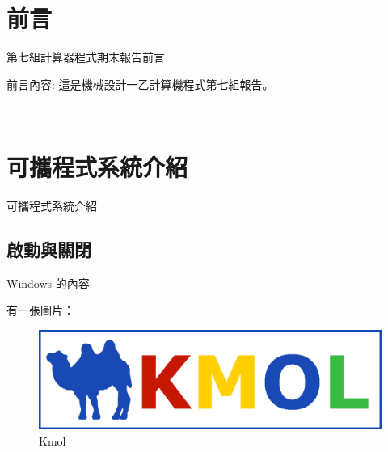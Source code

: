 \documentclass[12pt,,]{report}
\begin{document}
\begingroup
    \renewcommand{\contentsname}{\center 目錄 \addcontentsline{toc}{chapter}{目錄}}
    \renewcommand{\numberline}[1]{~#1\hspace*{1em}}
        \setcounter{tocdepth}{2}
    \tableofcontents
    \newcommand{\lotlabel}{表}
    \renewcommand{\listtablename}{\center 表目錄 \addcontentsline{toc}{chapter}{表目錄}}
    \renewcommand{\numberline}[1]{\lotlabel~#1\hspace*{1em}}
    \listoftables
    \newcommand{\loflabel}{圖}
    \renewcommand{\listfigurename}{\center 圖目錄 \addcontentsline{toc}{chapter}{圖目錄}}
    \renewcommand{\numberline}[1]{\loflabel~#1\hspace*{1em}}
    \listoffigures
\endgroup

\mainmatter
\hypertarget{ux524dux8a00}{%
\chapter{前言}\label{ux524dux8a00}}

第七組計算器程式期末報告前言

前言內容: 這是機械設計一乙計算機程式第七組報告。

~

\hypertarget{ux53efux651cux7a0bux5f0fux7cfbux7d71ux4ecbux7d39}{%
\chapter{可攜程式系統介紹}\label{ux53efux651cux7a0bux5f0fux7cfbux7d71ux4ecbux7d39}}

可攜程式系統介紹

\hypertarget{ux555fux52d5ux8207ux95dcux9589}{%
\section{啟動與關閉}\label{ux555fux52d5ux8207ux95dcux9589}}

Windows 的內容

有一張圖片：

\begin{figure}
\centering
\includegraphics{./tex2pdf.11512/e0ef408d9559203849a0aa26f79f9b032b709c7a.png}
\caption{Kmol\label{fig:駱駝}}
\end{figure}
\end{document}
